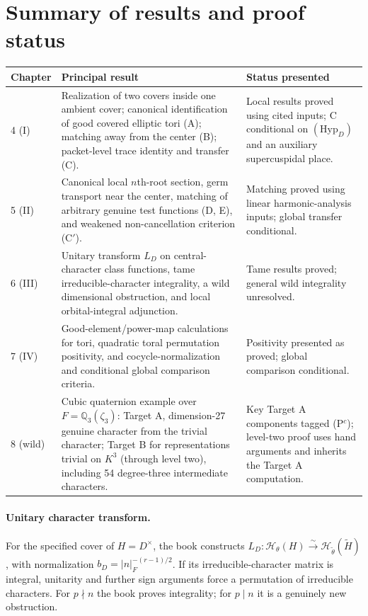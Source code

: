 \documentclass[12pt,letterpaper]{article}
\begin{document}
\section{Summary of results and proof status}
\begin{longtable}{@{}p{.12\linewidth}p{.56\linewidth}p{.23\linewidth}@{}}
\toprule Chapter & Principal result & Status presented\\\midrule\endhead
4 (I) & Realization of two covers inside one ambient cover; canonical
identification of good covered elliptic tori (A); matching away from the
center (B); packet-level trace identity and transfer (C). & Local results
proved using cited inputs; C conditional on $(\mathrm{Hyp}_D)$ and an
auxiliary supercuspidal place.\\
5 (II) & Canonical local $n$th-root section, germ transport near the center,
matching of arbitrary genuine test functions (D, E), and weakened
non-cancellation criterion (C$'$). & Matching proved using linear
harmonic-analysis inputs; global transfer conditional.\\
6 (III) & Unitary transform $L_D$ on central-character class functions,
tame irreducible-character integrality, a wild dimensional obstruction,
and local orbital-integral adjunction. & Tame results proved; general
wild integrality unresolved.\\
7 (IV) & Good-element/power-map calculations for tori, quadratic toral
permutation positivity, and cocycle-normalization and conditional global
comparison criteria. & Positivity presented as proved; global
comparison conditional.\\
8 (wild) & Cubic quaternion example over $F=\mathbb Q_3(\zeta_3)$:
Target A, dimension-27 genuine character from the trivial character;
Target B for representations trivial on $K^3$ (through level two),
including 54 degree-three intermediate characters. & Key Target A
components tagged (P$^c$); level-two proof uses hand arguments
and inherits the Target A computation.\\\bottomrule
\end{longtable}

\paragraph{Unitary character transform.}
For the specified cover of $H=D^\times$, the book constructs
$L_D:\mathcal H_\theta(H)\xrightarrow{\sim}
\mathcal H_{\widetilde\theta}(\widetilde H)$,
with normalization $b_D=|n|_F^{-(r-1)/2}$. If its irreducible-character
matrix is integral, unitarity and further sign arguments force a
permutation of irreducible characters. For $p\nmid n$ the book proves
integrality; for $p\mid n$ it is a genuinely new obstruction.
\end{document}
